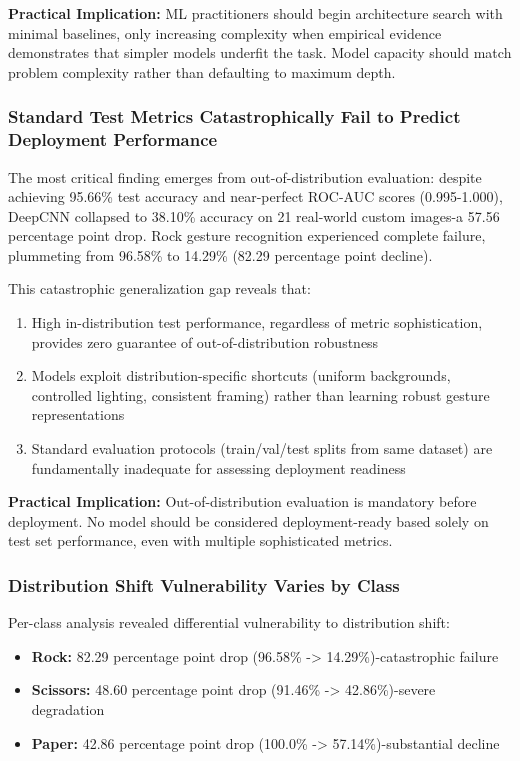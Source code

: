\documentclass[12pt,a4paper]{article}
\begin{document}
\textbf{Practical Implication:} ML practitioners should begin architecture search with minimal baselines, only increasing complexity when empirical evidence demonstrates that simpler models underfit the task. Model capacity should match problem complexity rather than defaulting to maximum depth.

\subsubsection{Standard Test Metrics Catastrophically Fail to Predict Deployment Performance}

The most critical finding emerges from out-of-distribution evaluation: despite achieving 95.66\% test accuracy and near-perfect ROC-AUC scores (0.995-1.000), DeepCNN collapsed to 38.10\% accuracy on 21 real-world custom images-a 57.56 percentage point drop. Rock gesture recognition experienced complete failure, plummeting from 96.58\% to 14.29\% (82.29 percentage point decline).

This catastrophic generalization gap reveals that:

\begin{enumerate}
    \item High in-distribution test performance, regardless of metric sophistication, provides zero guarantee of out-of-distribution robustness
    \item Models exploit distribution-specific shortcuts (uniform backgrounds, controlled lighting, consistent framing) rather than learning robust gesture representations
    \item Standard evaluation protocols (train/val/test splits from same dataset) are fundamentally inadequate for assessing deployment readiness
\end{enumerate}

\textbf{Practical Implication:} Out-of-distribution evaluation is mandatory before deployment. No model should be considered deployment-ready based solely on test set performance, even with multiple sophisticated metrics.

\subsubsection{Distribution Shift Vulnerability Varies by Class}

Per-class analysis revealed differential vulnerability to distribution shift:

\begin{itemize}
    \item \textbf{Rock:} 82.29 percentage point drop (96.58\% -> 14.29\%)-catastrophic failure
    \item \textbf{Scissors:} 48.60 percentage point drop (91.46\% -> 42.86\%)-severe degradation
    \item \textbf{Paper:} 42.86 percentage point drop (100.0\% -> 57.14\%)-substantial decline
\end{itemize}
\end{document}
